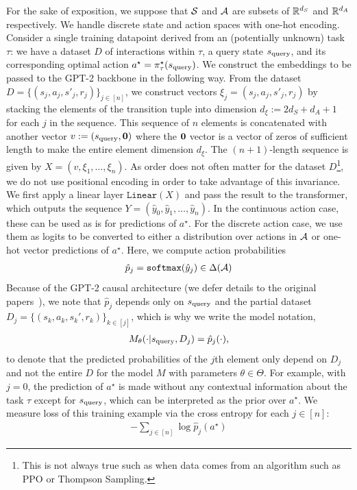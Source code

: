 For the sake of exposition, we suppose that ${\mathcal{S}}$ and $\mathcal{A}$ are subsets of $\mathbb{R}^{d_S}$ and $\mathbb{R}^{d_A}$ respectively. We handle discrete state and action spaces with one-hot encoding. Consider a single training datapoint derived from an (potentially unknown) task $\tau$: we have a dataset $D$ of interactions within $\tau$, a query state $s_{\text{query}}$, and its corresponding optimal action $a^\star = \pi^{\star}_\tau(s_{\text{query}})$.
We construct the embeddings to be passed to the GPT-2 backbone in the following way. From the dataset $D = \{ (s_j, a_j, s'_j, r_j) \}_{j \in [n]}$, we construct vectors $\xi_j = (s_j, a_j, s'_j, r_j)$ by stacking the elements of the transition tuple into dimension $d_{\xi} := 2d_S + d_A + 1$ for each $j$ in the sequence. This sequence of $n$ elements is concatenated with another vector $v := (s_{\text{query}}, {\bf 0})$ where the ${\bf 0}$ vector is a vector of zeros of sufficient length to make the entire element dimension $d_{\xi}$. The $(n+1)$-length sequence is given by $X = (v, \xi_1, \ldots, \xi_n)$. As order does not often matter for the dataset $D$\footnote{This is not always true such as when data comes from an algorithm such as PPO or Thompson Sampling.}, we do not use positional encoding in order to take advantage of this invariance.
We first apply a linear layer $\texttt{Linear}(X)$ and pass the result to the transformer, which outputs the sequence $Y = (\hat y_0, \hat y_1, \ldots, \hat y_n)$.  In the continuous action case, these can be used as is for predictions of $a^\star$. For the discrete action case, we use them as logits to be converted to either a distribution over actions in $\mathcal{A}$ or one-hot vector predictions of $a^\star$. Here, we compute action probabilities
\begin{align}
    \hat p_j = \texttt{softmax}(\hat y_j) \in \Delta(\mathcal{A})
\end{align}
Because of the GPT-2 causal architecture (we defer details to the original papers~\citep{radford2019language,brown2020language}), we note that $\hat p_j$ depends only on $s_{\text{query}}$ and the partial dataset $D_{j} = \{(s_k, a_k, s_k', r_k)\}_{k \in [j]}$, which is why we write the model notation,
\begin{align}
    M_{\theta}(\cdot | s_{\text{query}}, D_j) = \hat p_j(\cdot),
\end{align}
to denote that the predicted probabilities of the $j$th element only depend on $D_j$ and not the entire $D$ for the model $M$ with parameters $\theta \in \Theta$. For example, with $j = 0$, the prediction of $a^\star$ is made without any contextual information about the task $\tau$ except for $s_{\text{query}}$, which can be interpreted as the prior over $a^\star$.
We measure loss of this training example via the cross entropy for each $j \in [n]$:
\begin{align}\label{eq:app-loss}
-\sum_{j \in [n]} \log \hat p_{j}(a^\star)
\end{align}

